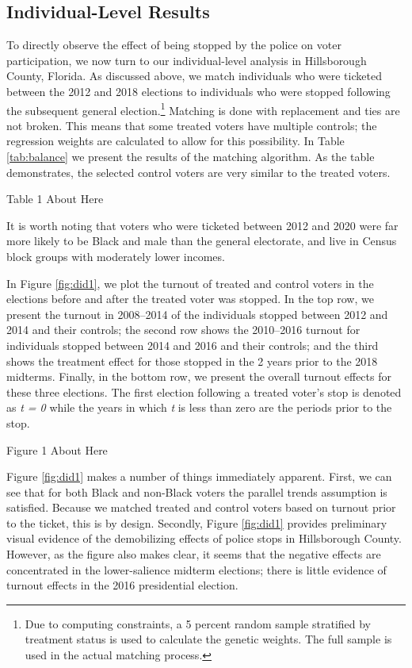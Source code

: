 \documentclass[
  12pt,
]{article}
\begin{document}
\hypertarget{individual-level-results}{%
\subsection*{Individual-Level Results}\label{individual-level-results}}

To directly observe the effect of being stopped by the police on voter participation, we now turn to our individual-level analysis in Hillsborough County, Florida. As discussed above, we match individuals who were ticketed between the 2012 and 2018 elections to individuals who were stopped following the subsequent general election.\footnote{Due to computing constraints, a 5 percent random sample stratified by treatment status is used to calculate the genetic weights. The full sample is used in the actual matching process.} Matching is done with replacement and ties are not broken. This means that some treated voters have multiple controls; the regression weights are calculated to allow for this possibility. In Table \ref{tab:balance} we present the results of the matching algorithm. As the table demonstrates, the selected control voters are very similar to the treated voters.

Table 1 About Here

It is worth noting that voters who were ticketed between 2012 and 2020 were far more likely to be Black and male than the general electorate, and live in Census block groups with moderately lower incomes.

In Figure \ref{fig:did1}, we plot the turnout of treated and control voters in the elections before and after the treated voter was stopped. In the top row, we present the turnout in 2008--2014 of the individuals stopped between 2012 and 2014 and their controls; the second row shows the 2010--2016 turnout for individuals stopped between 2014 and 2016 and their controls; and the third shows the treatment effect for those stopped in the 2 years prior to the 2018 midterms. Finally, in the bottom row, we present the overall turnout effects for these three elections. The first election following a treated voter's stop is denoted as \emph{t = 0} while the years in which \emph{t} is less than zero are the periods prior to the stop.

Figure 1 About Here

Figure \ref{fig:did1} makes a number of things immediately apparent. First, we can see that for both Black and non-Black voters the parallel trends assumption is satisfied. Because we matched treated and control voters based on turnout prior to the ticket, this is by design. Secondly, Figure \ref{fig:did1} provides preliminary visual evidence of the demobilizing effects of police stops in Hillsborough County. However, as the figure also makes clear, it seems that the negative effects are concentrated in the lower-salience midterm elections; there is little evidence of turnout effects in the 2016 presidential election.
\end{document}

